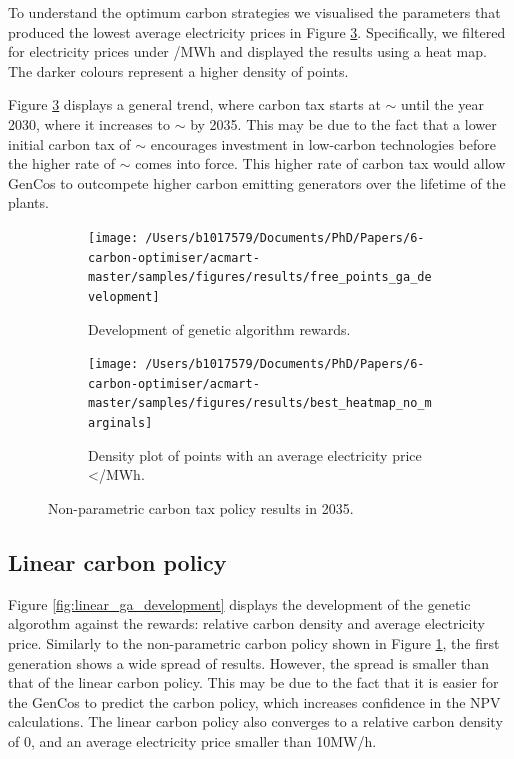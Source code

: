 \documentclass[sigconf]{acmart}
\begin{document}
To understand the optimum carbon strategies we visualised the parameters that produced the lowest average electricity prices in Figure \ref{fig:heatmap_of_free_points}. Specifically, we filtered for electricity prices under /MWh and displayed the results using a heat map. The darker colours represent a higher density of points. 

Figure \ref{fig:heatmap_of_free_points} displays a general trend, where carbon tax starts at ${\sim}$ until the year 2030, where it increases to ${\sim}$ by 2035. This may be due to the fact that a lower initial carbon tax of ${\sim}$ encourages investment in low-carbon technologies  before the higher rate of ${\sim}$ comes into force. This higher rate of carbon tax would allow GenCos to outcompete higher carbon emitting generators over the lifetime of the plants.





\begin{figure}
\begin{subfigure}[h]{0.49\linewidth}
\texttt{[image: /Users/b1017579/Documents/PhD/Papers/6-carbon-optimiser/acmart-master/samples/figures/results/free\_points\_ga\_development]}
\caption{Development of genetic algorithm rewards.}
\label{fig:free_points_ga_development}
\end{subfigure}%
\hfill
\begin{subfigure}[h]{0.5\linewidth}
\texttt{[image: /Users/b1017579/Documents/PhD/Papers/6-carbon-optimiser/acmart-master/samples/figures/results/best\_heatmap\_no\_marginals]}
\caption{Density plot of points with an average electricity price </MWh.}
\label{fig:heatmap_of_free_points}
\end{subfigure}
\caption{Non-parametric carbon tax policy results in 2035.}
\end{figure}






\subsection{Linear carbon policy}
\label{sssec:result_linear_carbon_strategy}

Figure \ref{fig:linear_ga_development} displays the development of the genetic algorothm against the rewards: relative carbon density and average electricity price. Similarly to the non-parametric carbon policy shown in Figure \ref{fig:free_points_ga_development}, the first generation shows a wide spread of results. However, the spread is smaller than that of the linear carbon policy. This may be due to the fact that it is easier for the GenCos to predict the carbon policy, which increases confidence in the NPV calculations. The linear carbon policy also converges to a relative carbon density of 0, and an average electricity price smaller than \textsterling10MW/h.
\end{document}
